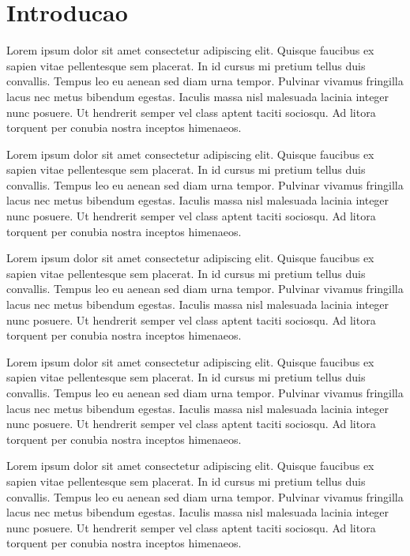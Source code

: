 \documentclass[12pt, a4paper]{article}
\begin{document}
\makecover

\tableofcontents
\cleardoublepage

\pagestyle{fancy}

\section{Introducao}

Lorem ipsum dolor sit amet consectetur adipiscing elit. Quisque faucibus ex sapien vitae pellentesque sem placerat. In id cursus mi pretium tellus duis convallis. Tempus leo eu aenean sed diam urna tempor. Pulvinar vivamus fringilla lacus nec metus bibendum egestas. Iaculis massa nisl malesuada lacinia integer nunc posuere. Ut hendrerit semper vel class aptent taciti sociosqu. Ad litora torquent per conubia nostra inceptos himenaeos.

Lorem ipsum dolor sit amet consectetur adipiscing elit. Quisque faucibus ex sapien vitae pellentesque sem placerat. In id cursus mi pretium tellus duis convallis. Tempus leo eu aenean sed diam urna tempor. Pulvinar vivamus fringilla lacus nec metus bibendum egestas. Iaculis massa nisl malesuada lacinia integer nunc posuere. Ut hendrerit semper vel class aptent taciti sociosqu. Ad litora torquent per conubia nostra inceptos himenaeos.

Lorem ipsum dolor sit amet consectetur adipiscing elit. Quisque faucibus ex sapien vitae pellentesque sem placerat. In id cursus mi pretium tellus duis convallis. Tempus leo eu aenean sed diam urna tempor. Pulvinar vivamus fringilla lacus nec metus bibendum egestas. Iaculis massa nisl malesuada lacinia integer nunc posuere. Ut hendrerit semper vel class aptent taciti sociosqu. Ad litora torquent per conubia nostra inceptos himenaeos.

Lorem ipsum dolor sit amet consectetur adipiscing elit. Quisque faucibus ex sapien vitae pellentesque sem placerat. In id cursus mi pretium tellus duis convallis. Tempus leo eu aenean sed diam urna tempor. Pulvinar vivamus fringilla lacus nec metus bibendum egestas. Iaculis massa nisl malesuada lacinia integer nunc posuere. Ut hendrerit semper vel class aptent taciti sociosqu. Ad litora torquent per conubia nostra inceptos himenaeos.

Lorem ipsum dolor sit amet consectetur adipiscing elit. Quisque faucibus ex sapien vitae pellentesque sem placerat. In id cursus mi pretium tellus duis convallis. Tempus leo eu aenean sed diam urna tempor. Pulvinar vivamus fringilla lacus nec metus bibendum egestas. Iaculis massa nisl malesuada lacinia integer nunc posuere. Ut hendrerit semper vel class aptent taciti sociosqu. Ad litora torquent per conubia nostra inceptos himenaeos.
\end{document}
